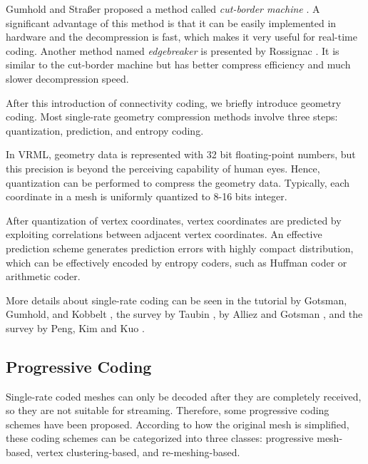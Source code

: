     Gumhold and Stra\ss{}er proposed a method called \emph{cut-border machine} \cite{280836}.
    A significant advantage of this method is that it can be easily implemented
    in hardware and the decompression is fast, which
    makes it very useful for real-time coding. 
    Another method named \emph{edgebreaker} is presented by Rossignac \cite{614421}.
    It is similar to the cut-border machine but has better
    compress efficiency and much slower decompression speed.
    
    After this introduction of connectivity coding, we briefly introduce geometry
    coding. Most single-rate geometry compression methods involve three steps:
    quantization, prediction, and entropy coding.

    In VRML, geometry data is represented with 32 bit floating-point
    numbers, but this precision is beyond the perceiving
    capability of human eyes. Hence, quantization can be performed to
    compress the geometry data. Typically, each coordinate in a mesh is
    uniformly quantized to 8-16 bits integer.

    After quantization of vertex coordinates, vertex coordinates are predicted
    by exploiting correlations between adjacent vertex
    coordinates. An effective prediction scheme generates prediction
    errors with highly compact distribution, which can be effectively
    encoded by entropy coders, such as Huffman coder or arithmetic
    coder. 

    More details about single-rate coding can be seen in the tutorial
    by Gotsman, Gumhold, and Kobbelt \cite{gotsman-simplification},
    the survey by Taubin \cite{3d:Taubin}, by Alliez and Gotsman
    \cite{recent:alliez}, and the survey by Peng, Kim and Kuo
    \cite{technologies:peng}.
    
    \subsection{Progressive Coding}
    Single-rate coded meshes can only be decoded after they are
    completely received, so they are not suitable for streaming. Therefore,
    some progressive coding schemes have been proposed. According to
    how the original mesh is simplified, these coding schemes can be
    categorized into three classes: progressive mesh-based, vertex
    clustering-based, and re-meshing-based.
    
